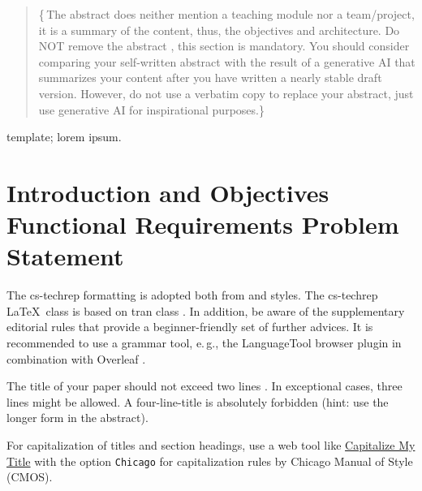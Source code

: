 \documentclass[conference,a4paper]{cs-techrep}
\begin{document}
\selectlanguage{\cstechrepLang}

\maketitle

\begin{abstract}
\lipsum[1][3-10]
\{\,\faWarning{}The abstract does neither mention a teaching module nor a team/project,
it is a summary of the content, thus, the objectives and architecture.
Do NOT remove the abstract \faWarning{}, this section is mandatory.
You should consider comparing your self-written abstract with the result of a generative AI that summarizes your content after you have written a nearly stable draft version. However, do not use a verbatim copy to replace your abstract, just use generative AI for inspirational purposes.\}
\end{abstract}

\begin{IEEEkeywords}
template; lorem ipsum.
\end{IEEEkeywords}

\section{Introduction and Objectives \textbar{} Functional Requirements \textbar{} Problem Statement}

The cs-techrep formatting is adopted both from  \cite{ieee2018formattingrules} and  \cite{iaria2014formattingrules} styles.
The cs-techrep \LaTeX\ class is based on tran class \cite{ieee2015howto}.
In addition, be aware of the supplementary  editorial rules \cite{iaria2009editorialrules} \faWarning{} that provide a beginner-friendly set of further advices.
It is recommended to use a grammar tool, e.\,g., the LanguageTool \cite{languagetool} browser plugin in combination with Overleaf \cite{overleaf}.

The title of your paper should not exceed two lines \faWarning{}. In exceptional cases, three lines might be allowed. A four-line-title is absolutely forbidden (hint: use the longer form in the abstract).

For capitalization of titles and section headings, use a web tool like \href{https://capitalizemytitle.com/style/Chicago/}{Capitalize My Title} \faWarning{} with the option \texttt{Chicago} for capitalization rules by Chicago Manual of Style (CMOS).
\end{document}

